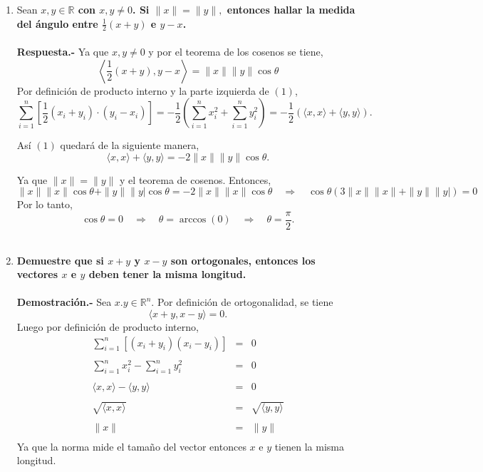 \begin{enumerate}

    \item Sean \textbf{\boldmath $x,y \in \mathbb{R}$ con $x,y\neq 0$. Si $\|x\|=\|y\|,$ entonces hallar la medida del ángulo entre $\frac{1}{2}(x+y)$ e $y-x$.\\\\
	Respuesta.-}\; Ya que $x,y\neq 0$ y por el teorema de los cosenos se tiene,
	\begin{equation}
	\left\langle \frac{1}{2}(x+y),y-x \right\rangle = \|x\|\|y\|\cos \theta 
	\end{equation}
	Por definición de producto interno y la parte izquierda de $(1)$,
	$$\sum_{i=1}^n \left[\dfrac{1}{2}(x_i+y_i)\cdot (y_i-x_i) \right]= -\dfrac{1}{2}\left(\sum_{i=1}^n x_i^2+\sum_{i=1}^n y_i^2\right) = -\dfrac{1}{2}\left(\langle x,x\rangle + \langle y,y\rangle \right).$$

	Así $(1)$ quedará de la siguiente manera,
	$$\langle x,x\rangle + \langle y,y\rangle = -2\|x\|\|y\|\cos \theta.$$

	Ya que $\|x\|=\|y\|$ y el teorema de cosenos. Entonces,
	$$\|x\|\|x\|\cos \theta + \|y\|\|y|\cos \theta = -2\|x\|\|x\|\cos \theta \quad \Rightarrow \quad \cos \theta \left(3\|x\|\|x\|+\|y\|\|y|\right)=0$$
	Por lo tanto,
	$$\cos \theta = 0 \quad \Rightarrow \quad \theta = \arccos(0) \quad \Rightarrow \quad \theta = \dfrac{\pi}{2}.$$\\
	

    \item \textbf{\boldmath Demuestre que si $x+y$ y $x-y$ son ortogonales, entonces los vectores $x$ e $y$ deben tener la misma longitud.\\\\
	Demostración.-}\; Sea $x.y\in \mathbb{R}^n$. Por definición de ortogonalidad, se tiene
	$$\langle x+y,x-y \rangle=0.$$
	Luego por definición de producto interno,
	$$\begin{array}{rcl}
	    \displaystyle\sum_{i=1}^n \left[(x_i+y_i)(x_i-y_i) \right]&=&0\\\\
	    \displaystyle\sum_{i=1}^n x_i^2 - \displaystyle\sum_{i=1}^n y_i^2&=&0\\\\
	    \langle x,x\rangle - \langle y,y\rangle &=&0\\\\
	    \sqrt{\langle x,x\rangle}&=&\sqrt{\langle y,y\rangle}\\\\
				     \|x\|&=&\|y\|\\
	\end{array}$$
	Ya que la norma mide el tamaño del vector entonces $x$ e $y$  tienen la misma longitud.\\\\



\end{enumerate}
